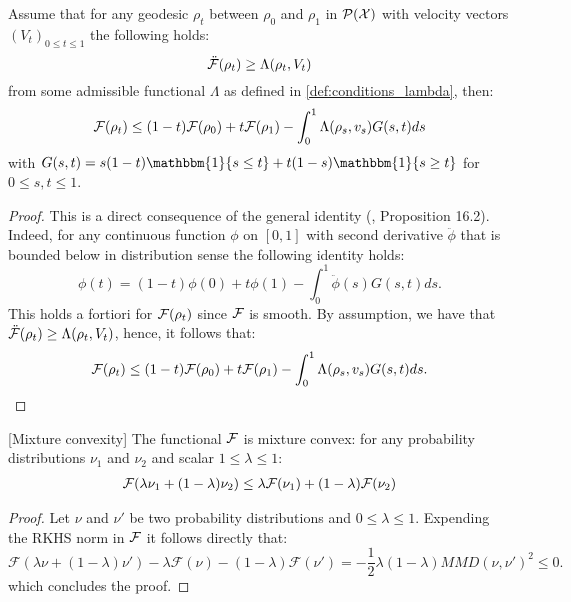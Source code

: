 \begin{lemma}\label{lem:integral_lambda_convexity}
Assume that for any geodesic $\rho_{t}$ between
$\rho_{0}$ and $\rho_{1}$ in $\mathcal{P}({{\mathcal X}})$ with velocity vectors $(V_t)_{0\leq t\leq 1}$ the following holds:
\[
\ddot{{{\mathcal F}}}(\rho_{t}) \geq \Lambda(\rho_t,V_t)
\]
from some admissible functional $\Lambda$ as defined in \cref{def:conditions_lambda}, then:
\begin{align*}
{{\mathcal F}}(\rho_{t})\leq(1-t){{\mathcal F}}(\rho_{0})+t{{\mathcal F}}(\rho_{1})-\int_{0}^{1}\Lambda(\rho_{s},v_{s})G(s,t)ds
\end{align*}
with $G(s,t)=s(1-t) \mathbbm{1}\{s\leq t\}
+t(1-s) \mathbbm{1}\{s\geq t\}$ for $0\leq s,t\leq 1$.

\end{lemma}
\begin{proof}
	This is a direct consequence of the general identity (\cite{Villani:2009},
	Proposition 16.2). Indeed, for any continuous function $\phi$ on
	$[0,1]$ with second derivative $\ddot{\phi}$ that is bounded below
	in distribution sense the following identity holds:
	\[
	\phi(t)=(1-t)\phi(0)+t\phi(1)-\int_{0}^{1}\ddot{\phi}(s)G(s,t)ds.
	\]
	This holds a fortiori for ${{\mathcal F}}(\rho_{t})$ since ${{\mathcal F}}$ is smooth. By assumption, we have that $\ddot{{{\mathcal F}}}(\rho_{t}) \geq \Lambda(\rho_t,V_t)$, hence, it follows that:
	\[
	{{\mathcal F}}(\rho_{t})\leq(1-t){{\mathcal F}}(\rho_{0})+t{{\mathcal F}}(\rho_{1})-\int_{0}^{1}\Lambda(\rho_{s},v_{s})G(s,t)ds.
	\]
\end{proof}


\begin{lemma}\label{lem:mixture_convexity}[Mixture convexity]
	The functional ${{\mathcal F}}$ is mixture convex: for any probability distributions $\nu_1$ and $\nu_2$ and scalar $1\leq \lambda\leq 1$:
	\begin{align*}
	{{\mathcal F}}(\lambda \nu_1+(1-\lambda)\nu_2)\leq \lambda {{\mathcal F}}(\nu_1)+ (1-\lambda){{\mathcal F}}(\nu_2)
	\end{align*}
\end{lemma}
\begin{proof}
	Let $\nu$ and $\nu'$ be two probability distributions and $0\leq \lambda\leq 1$. Expending the RKHS norm in ${{\mathcal F}}$ it follows directly that:
	\[
		\mathcal{F}(\lambda \nu + (1-\lambda)\nu') -\lambda \mathcal{F}(\nu) -(1-\lambda)\mathcal{F}(\nu') = -\frac{1}{2}\lambda(1-\lambda)MMD(\nu,\nu')^2 \leq 0.
	\]
	which concludes the proof.
\end{proof}


